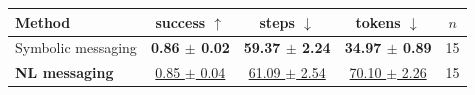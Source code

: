 \begin{tabular}{lcccc}
\toprule
Method & success $\uparrow$ & steps $\downarrow$ & tokens $\downarrow$ & $n$ \\
\midrule
Symbolic messaging & \textbf{0.86 $\pm$ 0.02} & \textbf{59.37 $\pm$ 2.24} & \textbf{34.97 $\pm$ 0.89} & 15 \\
\textbf{NL messaging} & \underline{0.85 $\pm$ 0.04} & \underline{61.09 $\pm$ 2.54} & \underline{70.10 $\pm$ 2.26} & 15 \\
\bottomrule
\end{tabular}
